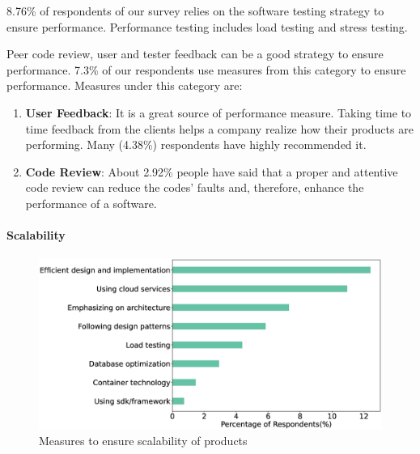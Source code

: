 8.76\% of respondents of our survey relies on the software testing strategy to ensure performance. Performance testing includes load testing and stress testing.
 
 Peer code review, user and tester feedback can be a good strategy to ensure performance. 7.3\% of our respondents use measures from this category to ensure performance. Measures under this category are:
 
 \begin{enumerate}[label=(\alph*)]
 
     \item \textbf{User Feedback}: It is a great source of performance measure. Taking time to time feedback from the clients helps a company realize how their products are performing. Many (4.38\%) respondents have highly recommended it.
    
    \item \textbf{Code Review}: About 2.92\% people have said that a proper and attentive code review can reduce the codes' faults and, therefore, enhance the performance of a software.
 
 \end{enumerate}


\paragraph{Scalability}
\label{Scalability}
\begin{figure}[h]
\centering
\includegraphics[scale=0.22]{Figures/Scalability.eps} 
\caption{Measures to ensure scalability of products}
\label{fig:Measures to ensure scalability}
\end{figure}


